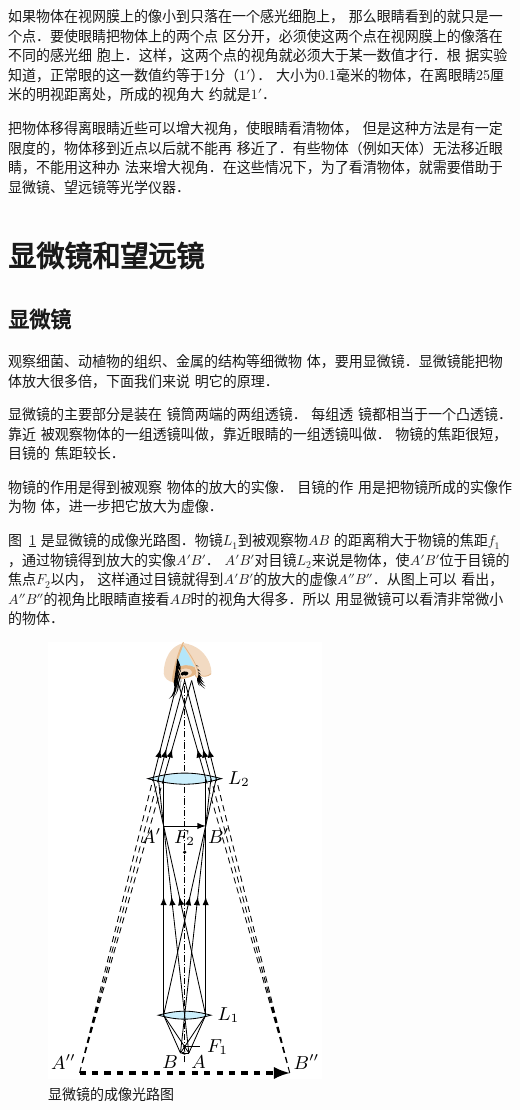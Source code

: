 如果物体在视网膜上的像小到只落在一个感光细胞上，
那么眼睛看到的就只是一个点．要使眼睛把物体上的两个点
区分开，必须使这两个点在视网膜上的像落在不同的感光细
胞上．这样，这两个点的视角就必须大于某一数值才行．根
据实验知道，正常眼的这一数值约等于1分（$1'$）．
大小为0.1毫米的物体，在离眼睛25厘米的明视距离处，所成的视角大
约就是$1'$．

把物体移得离眼睛近些可以增大视角，使眼睛看清物体，
但是这种方法是有一定限度的，物体移到近点以后就不能再
移近了．有些物体（例如天体）无法移近眼睛，不能用这种办
法来增大视角．在这些情况下，为了看清物体，就需要借助于
显微镜、望远镜等光学仪器．

\section{显微镜和望远镜}
\subsection{显微镜}

观察细菌、动植物的组织、金属的结构等细微物
体，要用显微镜．显微镜能把物体放大很多倍，下面我们来说
明它的原理．

显微镜的主要部分是装在
镜筒两端的两组透镜．
每组透
镜都相当于一个凸透镜．靠近
被观察物体的一组透镜叫做，靠近眼睛的一组透镜叫做．
物镜的焦距很短，目镜的
焦距较长．

物镜的作用是得到被观察
物体的放大的实像．
目镜的作
用是把物镜所成的实像作为物
体，进一步把它放大为虚像．



图~\ref{fig_C_5-53} 是显微镜的成像光路图．物镜$L_1$到被观察物$AB$
的距离稍大于物镜的焦距$f_1$，通过物镜得到放大的实像$A'B'$．
$A'B'$对目镜$L_2$来说是物体，使$A'B'$位于目镜的焦点$F_2$以内，
这样通过目镜就得到$A'B'$的放大的虚像$A''B''$．从图上可以
看出，$A''B''$的视角比眼睛直接看$AB$时的视角大得多．所以
用显微镜可以看清非常微小的物体．

\begin{figure}[htbp]
	\centering
	\includegraphics{fig/C/5-53.pdf}
	\caption{显微镜的成像光路图}\label{fig_C_5-53}
\end{figure}


